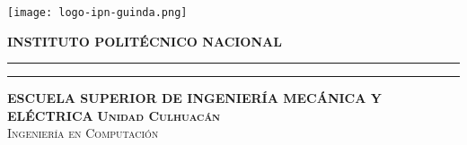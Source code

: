 
\thispagestyle{empty}
\begin{minipage}[c][0.17\textheight][c]{0.22\textwidth}
	\begin{center}
		\texttt{[image: logo-ipn-guinda.png]}
	\end{center}
\end{minipage}
\begin{minipage}[c][0.195\textheight][c]{0.71\textwidth}
	\begin{center}
		\vspace{0.3cm}
		\textbf{\textsc{\Large INSTITUTO POLIT\'ECNICO NACIONAL}}
		\vspace{0.4cm}
		\color{Black}\hrule height1pt
		\vspace{0.2cm}
		{\color{Black}\hrule height1pt}
		\vspace{0.4cm}
		\color{Black}\textbf{\textsc{ESCUELA SUPERIOR DE INGENIER\'IA MEC\'ANICA Y EL\'ECTRICA}}
		\textbf{\textsc{Unidad Culhuac\'an\\}}
		\textsc{Ingenier\'ia en Computaci\'on}\\[0.5cm] %
	\end{center}
\end{minipage}


